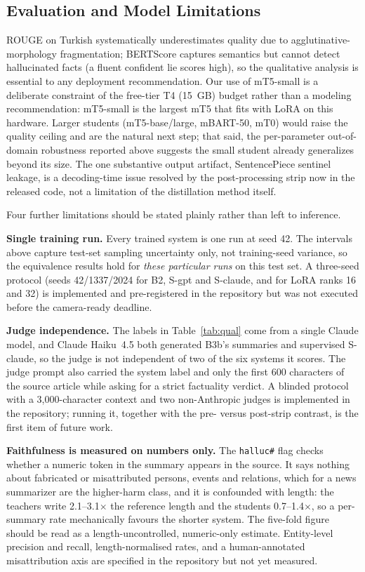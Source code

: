 \documentclass[conference]{IEEEtran}
\begin{document}
\subsection{Evaluation and Model Limitations}
ROUGE on Turkish systematically underestimates quality due to agglutinative-morphology fragmentation; BERTScore captures semantics but cannot detect hallucinated facts (a fluent confident lie scores high), so the qualitative analysis is essential to any deployment recommendation. Our use of mT5-small is a deliberate constraint of the free-tier T4 (15~GB) budget rather than a modeling recommendation: mT5-small is the largest mT5 that fits with LoRA on this hardware. Larger students (mT5-base/large, mBART-50, mT0) would raise the quality ceiling and are the natural next step; that said, the per-parameter out-of-domain robustness reported above suggests the small student already generalizes beyond its size. The one substantive output artifact, SentencePiece sentinel leakage, is a decoding-time issue resolved by the post-processing strip now in the released code, not a limitation of the distillation method itself.

Four further limitations should be stated plainly rather than left to inference.

\textbf{Single training run.} Every trained system is one run at seed 42. The intervals above capture test-set sampling uncertainty only, not training-seed variance, so the equivalence results hold for \emph{these particular runs} on this test set. A three-seed protocol (seeds 42/1337/2024 for B2, S-gpt and S-claude, and for LoRA ranks 16 and 32) is implemented and pre-registered in the repository but was not executed before the camera-ready deadline.

\textbf{Judge independence.} The labels in Table~\ref{tab:qual} come from a single Claude model, and Claude Haiku~4.5 both generated B3b's summaries and supervised S-claude, so the judge is not independent of two of the six systems it scores. The judge prompt also carried the system label and only the first 600 characters of the source article while asking for a strict factuality verdict. A blinded protocol with a 3{,}000-character context and two non-Anthropic judges is implemented in the repository; running it, together with the pre- versus post-strip contrast, is the first item of future work.

\textbf{Faithfulness is measured on numbers only.} The \texttt{halluc\#} flag checks whether a numeric token in the summary appears in the source. It says nothing about fabricated or misattributed persons, events and relations, which for a news summarizer are the higher-harm class, and it is confounded with length: the teachers write 2.1--3.1$\times$ the reference length and the students 0.7--1.4$\times$, so a per-summary rate mechanically favours the shorter system. The five-fold figure should be read as a length-uncontrolled, numeric-only estimate. Entity-level precision and recall, length-normalised rates, and a human-annotated misattribution axis are specified in the repository but not yet measured.
\end{document}
